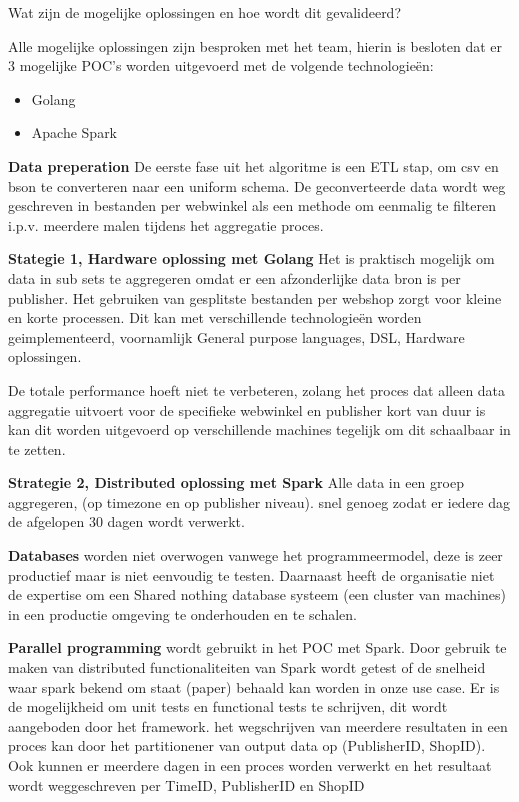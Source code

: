 Wat zijn de mogelijke oplossingen en hoe wordt dit gevalideerd?

Alle mogelijke oplossingen zijn besproken met het team, hierin is besloten dat er 3 mogelijke POC's worden uitgevoerd met de volgende technologieën:

\begin{itemize}
    \item Golang
    \item Apache Spark
\end{itemize}

\textbf{Data preperation}
De eerste fase uit het algoritme is een ETL stap, om csv en bson te converteren naar een uniform schema.
De geconverteerde data wordt weg geschreven in bestanden per webwinkel als een methode om eenmalig te filteren i.p.v. meerdere malen tijdens het aggregatie proces.


\textbf{Stategie 1, Hardware oplossing met Golang} 
Het is praktisch mogelijk om data in sub sets te aggregeren omdat er een afzonderlijke data bron is per publisher. 
Het gebruiken van gesplitste bestanden per webshop zorgt voor kleine  en korte processen. Dit kan met verschillende technologieën worden geimplementeerd, voornamlijk General purpose languages, DSL, Hardware oplossingen.

De totale performance hoeft niet te verbeteren, zolang het proces dat alleen data aggregatie uitvoert voor de specifieke webwinkel en publisher kort van duur is kan dit worden uitgevoerd op verschillende machines tegelijk om dit schaalbaar in te zetten.
    
\textbf{Strategie 2, Distributed oplossing met Spark}
Alle data in een groep aggregeren, (op timezone en op publisher niveau). snel genoeg zodat er iedere dag de afgelopen 30 dagen wordt verwerkt.


\textbf{Databases} worden niet overwogen vanwege het programmeermodel, deze is zeer productief maar is niet eenvoudig te testen. Daarnaast heeft de organisatie niet de expertise om een Shared nothing database systeem (een cluster van machines) in een productie omgeving te onderhouden en te schalen.

\textbf{Parallel programming} wordt gebruikt in het POC met Spark. Door gebruik te maken van distributed functionaliteiten van Spark wordt getest of de snelheid waar spark bekend om staat (paper) behaald kan worden in onze use case. Er is de mogelijkheid om unit tests en functional tests te schrijven, dit wordt aangeboden door het framework.
het wegschrijven van meerdere resultaten in een proces kan door het partitionener van output data op (PublisherID, ShopID). Ook kunnen er meerdere dagen in een proces worden verwerkt en het resultaat wordt weggeschreven per TimeID, PublisherID en ShopID

